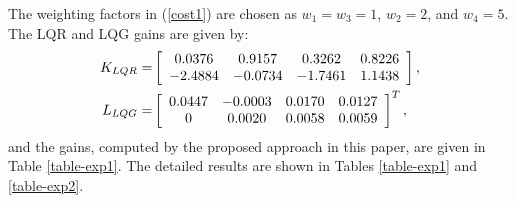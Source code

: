 \documentclass{amsart}
\numberwithin{equation}{section}
\begin{document}
The weighting factors in (\ref{cost1}) are chosen as $w_1=w_3=1$, $w_2=2$, and $w_4=5$. The LQR and LQG gains are given by:  
\begin{align}\nonumber
K_{LQR}=&\left[{\begin{array}{cccc}
0.0376&0.9157&0.3262&0.8226\\
-2.4884&-0.0734&-1.7461&1.1438\\
 \end{array}}\right],\\\notag
L_{LQG}=&\left[{\begin{array}{cccc}
0.0447&-0.0003&0.0170&0.0127\\
0&0.0020&0.0058&0.0059\\
 \end{array}}\right]^T,
\end{align}
and the gains, computed by the proposed approach in this paper, are given in Table \ref{table-exp1}. The detailed results are shown in Tables \ref{table-exp1} and \ref{table-exp2}. 
\end{document}
